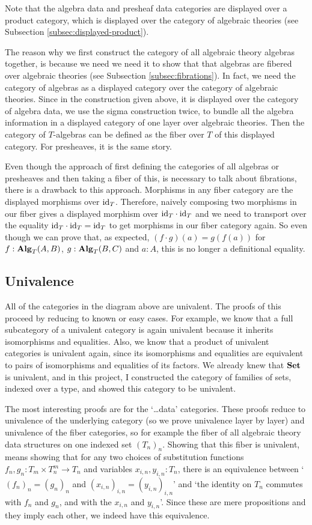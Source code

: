 Note that the algebra data and presheaf data categories are displayed over a product category, which is displayed over the category of algebraic theories (see Subsection \ref{subsec:displayed-product}).

The reason why we first construct the category of all algebraic theory algebras together, is because we need we need it to show that that algebras are fibered over algebraic theories (see Subsection \ref{subsec:fibrations}). In fact, we need the category of algebras as a displayed category over the category of algebraic theories. Since in the construction given above, it is displayed over the category of algebra data, we use the sigma construction twice, to bundle all the algebra information in a displayed category of one layer over algebraic theories. Then the category of $ T $-algebras can be defined as the fiber over $ T $ of this displayed category. For presheaves, it is the same story.

Even though the approach of first defining the categories of all algebras or presheaves and then taking a fiber of this, is necessary to talk about fibrations, there is a drawback to this approach. Morphisms in any fiber category are the displayed morphisms over $ \text{id}_{T} $. Therefore, naively composing two morphisms in our fiber gives a displayed morphism over $ \text{id}_{T} \cdot \text{id}_{T} $ and we need to transport over the equality $ \text{id}_{T} \cdot \text{id}_{T} = \text{id}_{T} $ to get morphisms in our fiber category again. So even though we can prove that, as expected, $ (f \cdot g)(a) = g(f(a)) $ for $ f: \mathbf{Alg}_{T}(A, B) $, $ g: \mathbf{Alg}_{T}(B, C) $ and $ a : A $, this is no longer a definitional equality.

\subsection{Univalence}
All of the categories in the diagram above are univalent. The proofs of this proceed by reducing to known or easy cases. For example, we know that a full subcategory of a univalent category is again univalent because it inherits isomorphisms and equalities. Also, we know that a product of univalent categories is univalent again, since its isomorphisms and equalities are equivalent to pairs of isomorphisms and equalities of its factors. We already knew that $ \mathbf{Set} $ is univalent, and in this project, I constructed the category of families of sets, indexed over a type, and showed this category to be univalent.

The most interesting proofs are for the `\dots data' categories. These proofs reduce to univalence of the underlying category (so we prove univalence layer by layer) and univalence of the fiber categories, so for example the fiber of all algebraic theory data structures on one indexed set $ (T_n)_n $. Showing that this fiber is univalent, means showing that for any two choices of substitution functions $ f_n, g_n: T_m \times T_n^m \to T_n $ and variables $ x_{i, n}, y_{i, n} : T_n $, there is an equivalence between `$ (f_n)_n = (g_n)_n $ and $ (x_{i, n})_{i, n} = (y_{i, n})_{i, n} $' and `the identity on $ T_n $ commutes with $ f_n $ and $ g_n $, and with the $ x_{i, n} $ and $ y_{i, n} $'. Since these are mere propositions and they imply each other, we indeed have this equivalence.

